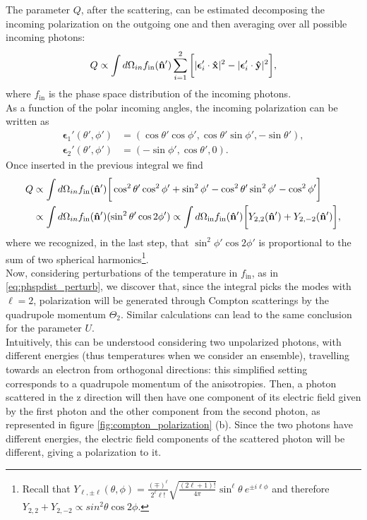 The parameter $Q$, after the scattering, can be estimated decomposing the incoming polarization on the outgoing one and then averaging over all possible incoming photons:
$$Q\propto\int d\Omega_{in} f_{\text{in}}(\mathbf{\hat{n}}')\sum_{i=1}^{2}\bigg[|\boldsymbol{\epsilon}_{i}'\cdot\mathbf{\hat{x}}|^2-|\boldsymbol{\epsilon}_{i}'\cdot\mathbf{\hat{y}}|^2\bigg],$$
where $f_{\text{in}}$ is the phase space distribution of the incoming photons.\\
As a function of the polar incoming angles, the incoming polarization can be written as
\begin{align*}
    \boldsymbol{\epsilon}_1'(\theta',\phi') &=(\cos\theta'\cos\phi',\cos\theta'\sin\phi',-\sin\theta'),\\
    \boldsymbol{\epsilon}_2'(\theta',\phi') &=(-\sin\phi',\cos\theta',0).
\end{align*} 
Once inserted in the previous integral we find
\begin{align*}
    Q&\propto\int d\Omega_{in} f_{\text{in}}(\mathbf{\hat{n}}')\bigg[\cos^2\theta'\cos^2\phi'+\sin^2\phi'-\cos^2\theta'\sin^2\phi'-\cos^2\phi'\bigg]\\&\propto\int d\Omega_{in} f_{\text{in}}(\mathbf{\hat{n}}')(\sin^2\theta'\cos2\phi')\propto\int d\Omega_{\text{in}}f_{\text{in}}(\mathbf{\hat{n}}')\bigg[Y_{2,2}(\mathbf{\hat{n}}')+Y_{2,-2}(\mathbf{\hat{n}}')\bigg],
\end{align*}
where we recognized, in the last step, that $\sin^2\phi'\cos2\phi'$ is proportional to the sum of two spherical harmonics\footnote{Recall that $Y_{\ell,\pm\ell}(\theta,\phi)=\frac{(\mp)^\ell}{2^\ell\ell!}\sqrt{\frac{(2\ell+1)!}{4\pi}}\sin^\ell\theta\ e^{\pm i\ell\phi}$ and therefore $Y_{2,2}+Y_{2,-2}\propto sin^2\theta\cos2\phi$.}.\\
Now, considering perturbations of the temperature in $f_{\text{in}}$, as in \eqref{eq:phspdist_perturb}, we discover that, since the integral picks the modes with $\ell=2$, polarization will be generated through Compton scatterings by the quadrupole momentum $\Theta_2$. Similar calculations can lead to the same conclusion for the parameter $U$.\\ Intuitively, this can be understood considering two unpolarized photons, with different energies (thus temperatures when we consider an ensemble), travelling towards an electron from orthogonal directions: this simplified setting corresponds to a quadrupole momentum of the anisotropies. Then, a photon scattered in the z direction will then have one component of its electric field given by the first photon and the other component from the second photon, as represented in figure \ref{fig:compton_polarization} (b). Since the two photons have different energies, the electric field components of the scattered photon will be different, giving a polarization to it. 

